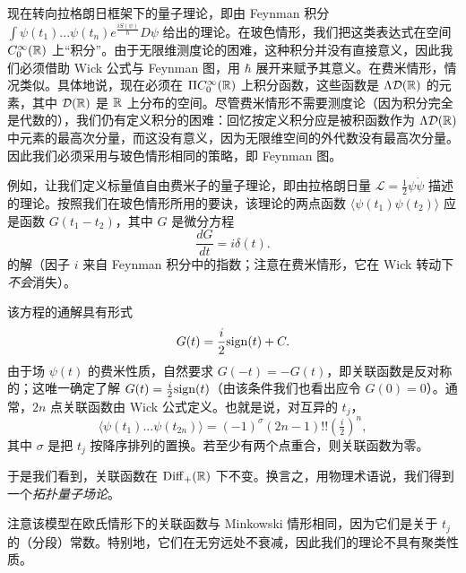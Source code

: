 
现在转向拉格朗日框架下的量子理论，即由 Feynman 积分 $\int \psi(t_1)...\psi(t_n)e^{\frac{iS(\psi)}{\hbar}}D\psi$ 给出的理论。在玻色情形，我们把这类表达式在空间 $C^\infty_0(\Bbb R)$ 上“积分”。由于无限维测度论的困难，这种积分并没有直接意义，因此我们必须借助 Wick 公式与 Feynman 图，用 $\hbar$ 展开来赋予其意义。在费米情形，情况类似。具体地说，现在必须在 $\Pi C^\infty_0(\Bbb R)$ 上积分函数，这些函数是 $\Lambda {\mathcal D}(\Bbb R)$ 的元素，其中 ${\mathcal D}(\Bbb R)$ 是 $\Bbb R$ 上分布的空间。尽管费米情形不需要测度论（因为积分完全是代数的），我们仍有定义积分的困难：回忆按定义积分应是被积函数作为 $\Lambda {\mathcal D}(\Bbb R)$ 中元素的最高次分量，而这没有意义，因为无限维空间的外代数没有最高次分量。因此我们必须采用与玻色情形相同的策略，即 Feynman 图。

例如，让我们定义标量值自由费米子的量子理论，即由拉格朗日量 ${\mathcal L}=\frac{1}{2}\psi\dot{\psi}$ 描述的理论。按照我们在玻色情形所用的要诀，该理论的两点函数 $\langle\psi(t_1)\psi(t_2)\rangle$ 应是函数 $G(t_1-t_2)$，其中 $G$ 是微分方程
$$
\frac{dG}{dt}=i\delta(t).
$$
的解（因子 $i$ 来自 Feynman 积分中的指数；注意在费米情形，它在 Wick 转动下\emph{不会}消失）。

该方程的通解具有形式
$$
G(t)=\frac{i}{2}{\rm sign}(t)+C.
$$
由于场 $\psi(t)$ 的费米性质，自然要求 $G(-t)=-G(t)$，即关联函数是反对称的；这唯一确定了解 $G(t)=\frac{i}{2}{\rm sign}(t)$（由该条件我们也看出应令 $G(0)=0$）。通常，$2n$ 点关联函数由 Wick 公式定义。也就是说，对互异的 $t_j$，
$$
\langle\psi(t_1)...\psi(t_{2n})\rangle=(-1)^\sigma(2n-1)!!(\tfrac{i}{2})^n,
$$
其中 $\sigma$ 是把 $t_j$ 按降序排列的置换。若至少有两个点重合，则关联函数为零。

于是我们看到，关联函数在 ${\rm Diff}_+(\Bbb R)$ 下不变。换言之，用物理术语说，我们得到一个\emph{拓扑量子场论}。

注意该模型在欧氏情形下的关联函数与 Minkowski 情形相同，因为它们是关于 $t_j$ 的（分段）常数。特别地，它们在无穷远处不衰减，因此我们的理论不具有聚类性质。


